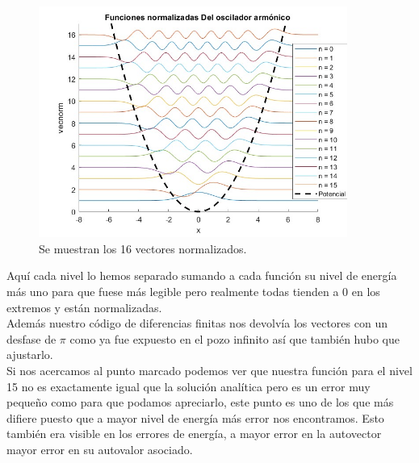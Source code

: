 \documentclass[12pt]{article}
\begin{document}
    \begin{figure}[H]
        \centering
        \includegraphics[width=0.9\textwidth]{fotos/16funcionesoscilador.jpg}
        \caption{Se muestran los 16 vectores normalizados.}
        \label{PolinomiosHermite}
    \end{figure}
    
    Aquí cada nivel lo hemos separado sumando a cada función su nivel de energía más uno para que fuese más legible pero realmente todas tienden a 0 en los extremos y están normalizadas.\\
    
    Además nuestro código de diferencias finitas nos devolvía los vectores con un desfase de $\pi$ como ya fue expuesto en el pozo infinito así que también hubo que ajustarlo. \\
    
    Si nos acercamos al punto marcado podemos ver que nuestra función para el nivel 15 no es exactamente igual que la solución analítica pero es un error muy pequeño como para que podamos apreciarlo, este punto es uno de los que más difiere puesto que a mayor nivel de energía más error nos encontramos. Esto también era visible en los errores de energía, a mayor error en la autovector mayor error en su autovalor asociado.
    
\end{document}

